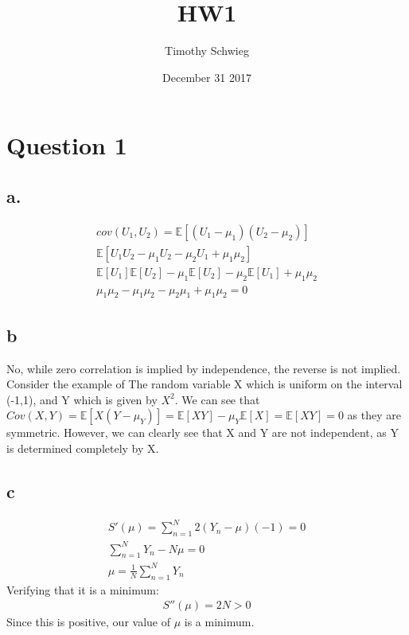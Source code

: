 \documentclass[10pt,letterpaper]{paper}
\title{ HW1  }
\author{ Timothy Schwieg }
\date{ December 31 2017 }
\newcommand*{\ex}{\mathbb{E}}
\begin{document}
\maketitle


\section*{Question 1}

\subsection*{a.}

\begin{align*}
  cov( U_1,U_2) = \mathbb{E}[(U_1-\mu_1)(U_2-\mu_2)]\\
  \mathbb{E}[U_1U_2 - \mu_1U_2 - \mu_2U_1 + \mu_1\mu_2]\\
  \mathbb{E}[U_1]\ex [U_2] - \mu_1 \ex [U_2] - \mu_2 \ex [U_1] + \mu_1\mu_2\\
  \mu_1\mu_2 - \mu_1\mu_2 - \mu_2\mu_1 + \mu_1\mu_2 = 0
\end{align*}

\subsection*{b}

No, while zero correlation is implied by independence, the reverse is not
implied. Consider the example of The random variable X which is uniform on the
interval (-1,1), and Y which is given by $X^2$. We can see that $Cov(X,Y) = \ex
[X(Y-\mu_Y)] = \ex [XY] - \mu_Y \ex [X] = \ex [XY] = 0$ as they are
symmetric. However, we can clearly see that X and Y are not independent, as Y is
determined completely by X.

\subsection*{c}

\begin{align*}
  S'(\mu) = \sum_{n=1}^N2(Y_n - \mu )(-1) = 0\\
  \sum_{n=1}^NY_n - N\mu = 0\\
  \mu = \frac{1}{N} \sum_{n=1}^N Y_n
\end{align*}
Verifying that it is a minimum:
\begin{align*}
  S''(\mu) = 2N > 0
\end{align*}
Since this is positive, our value of $\mu$ is a minimum.
\end{document}
